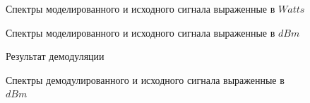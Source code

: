 \documentclass[a4paper,14pt]{extarticle}
\begin{document}
\begin{figure}[H]
\caption{Спектры моделированного и исходного сигнала выраженные в $Watts$}
\label{302}
\end{figure}

\begin{figure}[H]
\caption{Спектры моделированного и исходного сигнала выраженные в $dBm$}
\label{303}
\end{figure}

\begin{figure}[H]
\caption{Результат демодуляции}
\label{016}
\end{figure}

\begin{figure}[H]
\caption{Спектры демодулированного и исходного сигнала выраженные в $dBm$}
\label{017}
\end{figure}
\end{document}
